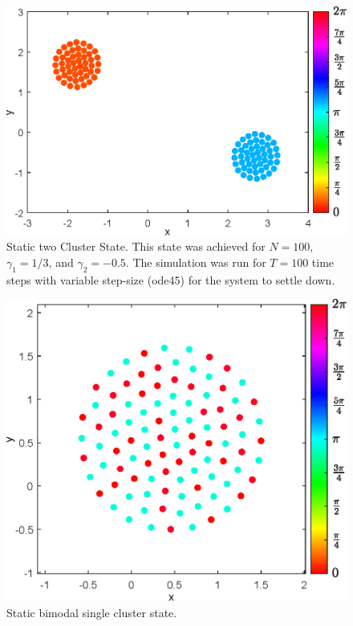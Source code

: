 \documentclass[twocolumn,10pt]{asme2ej}
\begin{document}
{\begin{figure}[h!]
        \includegraphics[width = \linewidth]{TwoCluster.eps}
        \caption{Static two Cluster State. This state was achieved for \(N = 100\), \(\gamma_1 = 1/3\), and \(\gamma_2 = -0.5\). The simulation was run for \(T = 100\) time steps with variable step-size (ode45) for the system to settle down.}
        \vspace{-12mm}
        \label{fig:static2}
    \end{figure}
    \begin{figure}
        \includegraphics[width = \linewidth]{staticSingleClusterState.eps}
        \caption{Static bimodal single cluster state.}
        \label{fig:staticSingleClusterState}

\end{figure}}
\end{document}
